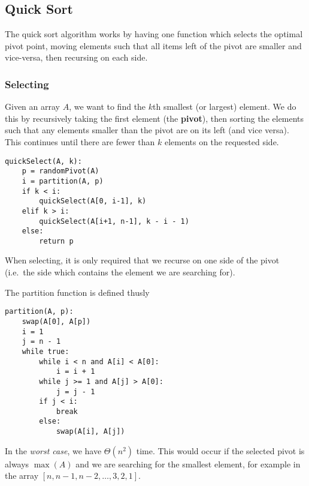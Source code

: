 \documentclass[12pt]{article}
\begin{document}
\subsection{Quick Sort}
The quick sort algorithm works by having one function which selects the optimal pivot point, moving elements such that all items left of the pivot are smaller and vice-versa, then recursing on each side.

\subsubsection{Selecting}
Given an array $A$, we want to find the $k$th smallest (or largest) element. We do this by recursively taking the first element (the {\bf pivot}), then sorting the elements such that any elements smaller than the pivot are on its left (and vice versa). This continues until there are fewer than $k$ elements on the requested side.

\begin{verbatim}
quickSelect(A, k):
    p = randomPivot(A)
    i = partition(A, p)
    if k < i:
        quickSelect(A[0, i-1], k)
    elif k > i:
        quickSelect(A[i+1, n-1], k - i - 1)
    else:
        return p
\end{verbatim}

When selecting, it is only required that we recurse on one side of the pivot (i.e.\ the side which contains the element we are searching for).

The partition function is defined thusly
\begin{verbatim}
partition(A, p):
    swap(A[0], A[p])
    i = 1
    j = n - 1
    while true:
        while i < n and A[i] < A[0]:
            i = i + 1
        while j >= 1 and A[j] > A[0]:
            j = j - 1
        if j < i:
            break
        else:
            swap(A[i], A[j])
\end{verbatim}

In the \emph{worst case}, we have $\Theta(n^2)$ time. This would occur if the selected pivot is always $\max(A)$ and we are searching for the smallest element, for example in the array $[n, n-1, n-2, \dots, 3, 2, 1]$.
\end{document}
